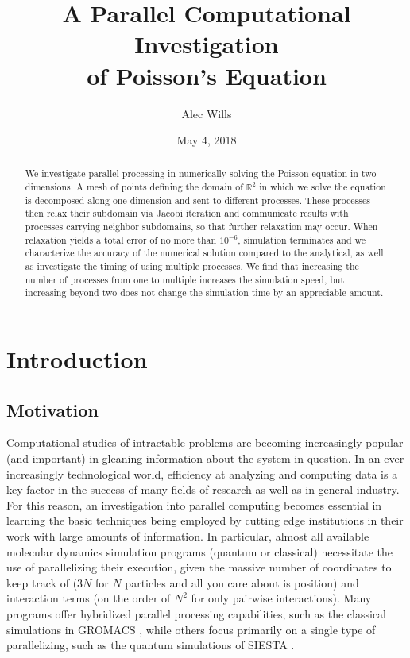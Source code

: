 \documentclass[reprint, amsmath, amssymb, aps, floatfix]{revtex4-1}
\begin{document}
\title{A Parallel Computational Investigation\\of Poisson's Equation}

\author{Alec Wills}
\date{May 4, 2018}

\begin{abstract}
	We investigate  parallel processing in numerically solving the Poisson equation in two dimensions. A mesh of points defining the domain of $\mathbb{R}^2$ in which we solve the equation is decomposed along one dimension and sent to different processes. These processes then relax their subdomain via Jacobi iteration and communicate results with processes carrying neighbor subdomains, so that further relaxation may occur. When relaxation yields a total error of no more than $10^{-6}$, simulation terminates and we characterize the accuracy of the numerical solution compared to the analytical, as well as investigate the timing of using multiple processes. We find that increasing the number of processes from one to multiple increases the simulation speed, but increasing beyond two does not change the simulation time by an appreciable amount.
\end{abstract}

\maketitle

\section{Introduction}

\subsection{Motivation}

Computational studies of intractable problems are becoming increasingly popular (and important) in gleaning information about the system in question. In an ever increasingly technological world, efficiency at analyzing and computing data is a key factor in the success of many fields of research as well as in general industry. For this reason, an investigation into parallel computing becomes essential in learning the basic techniques being employed by cutting edge institutions in their work with large amounts of information. In particular, almost all available molecular dynamics simulation programs (quantum or classical) necessitate the use of parallelizing their execution, given the massive number of coordinates to keep track of ($3N$ for $N$ particles and all you care about is position) and interaction terms (on the order of $N^2$ for only pairwise interactions). Many programs offer hybridized parallel processing capabilities, such as the classical simulations in GROMACS \cite{gromacs}, while others focus primarily on a single type of parallelizing, such as the quantum simulations of SIESTA \cite{siesta}.
\end{document}
